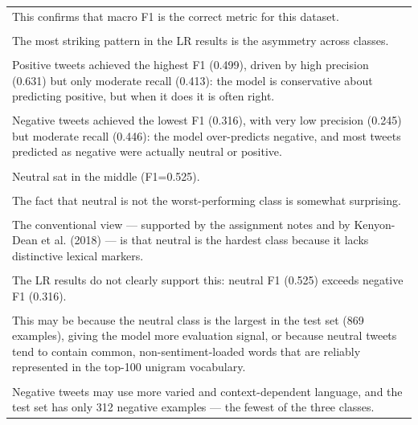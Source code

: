 \documentclass[11pt]{article}
\begin{document}
\begin{longtable}{|p{\dimexpr\linewidth-2\tabcolsep-2\arrayrulewidth\relax}|}
\hline
\rule{0pt}{3.5cm} \\
\hline
This confirms that macro F1 is the correct metric for this dataset. \\[2pt]
\hline
\rule{0pt}{3.5cm} \\
\hline
The most striking pattern in the LR results is the asymmetry across classes. \\[2pt]
\hline
\rule{0pt}{3.5cm} \\
\hline
Positive tweets achieved the highest F1 (0.499), driven by high precision (0.631) but only moderate recall (0.413): the model is conservative about predicting positive, but when it does it is often right. \\[2pt]
\hline
\rule{0pt}{3.5cm} \\
\hline
Negative tweets achieved the lowest F1 (0.316), with very low precision (0.245) but moderate recall (0.446): the model over-predicts negative, and most tweets predicted as negative were actually neutral or positive. \\[2pt]
\hline
\rule{0pt}{3.5cm} \\
\hline
Neutral sat in the middle (F1=0.525). \\[2pt]
\hline
\rule{0pt}{3.5cm} \\
\hline
The fact that neutral is not the worst-performing class is somewhat surprising. \\[2pt]
\hline
\rule{0pt}{3.5cm} \\
\hline
The conventional view --- supported by the assignment notes and by Kenyon-Dean et al. (2018) --- is that neutral is the hardest class because it lacks distinctive lexical markers. \\[2pt]
\hline
\rule{0pt}{3.5cm} \\
\hline
The LR results do not clearly support this: neutral F1 (0.525) exceeds negative F1 (0.316). \\[2pt]
\hline
\rule{0pt}{3.5cm} \\
\hline
This may be because the neutral class is the largest in the test set (869 examples), giving the model more evaluation signal, or because neutral tweets tend to contain common, non-sentiment-loaded words that are reliably represented in the top-100 unigram vocabulary. \\[2pt]
\hline
\rule{0pt}{3.5cm} \\
\hline
Negative tweets may use more varied and context-dependent language, and the test set has only 312 negative examples --- the fewest of the three classes. \\[2pt]

\end{longtable}
\end{document}
